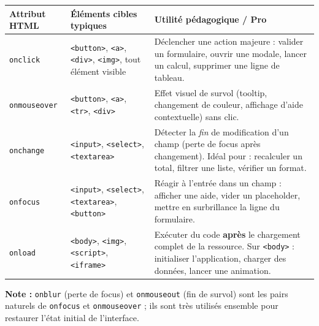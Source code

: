 \documentclass[11pt]{article}
\begin{document}
\begin{center}
\begin{tabularx}{\linewidth}{|l|X|X|}\hline
\rowcolor{popblueL}
\textbf{Attribut HTML} & \textbf{Éléments cibles typiques} & \textbf{Utilité pédagogique / Pro} \\\hline
\texttt{onclick} & \texttt{<button>}, \texttt{<a>}, \texttt{<div>}, \texttt{<img>}, tout élément visible & Déclencher une action majeure : valider un formulaire, ouvrir une modale, lancer un calcul, supprimer une ligne de tableau. \\\hline
\texttt{onmouseover} & \texttt{<button>}, \texttt{<a>}, \texttt{<tr>}, \texttt{<div>} & Effet visuel de survol (tooltip, changement de couleur, affichage d'aide contextuelle) sans clic. \\\hline
\texttt{onchange} & \texttt{<input>}, \texttt{<select>}, \texttt{<textarea>} & Détecter la \emph{fin} de modification d'un champ (perte de focus après changement). Idéal pour : recalculer un total, filtrer une liste, vérifier un format. \\\hline
\texttt{onfocus} & \texttt{<input>}, \texttt{<select>}, \texttt{<textarea>}, \texttt{<button>} & Réagir à l'entrée dans un champ : afficher une aide, vider un placeholder, mettre en surbrillance la ligne du formulaire. \\\hline
\texttt{onload} & \texttt{<body>}, \texttt{<img>}, \texttt{<script>}, \texttt{<iframe>} & Exécuter du code \textbf{après} le chargement complet de la ressource. Sur \texttt{<body>} : initialiser l'application, charger des données, lancer une animation. \\\hline
\end{tabularx}
\end{center}

\textbf{Note :} \texttt{onblur} (perte de focus) et \texttt{onmouseout} (fin de survol) sont les pairs naturels de \texttt{onfocus} et \texttt{onmouseover} ; ils sont très utilisés ensemble pour restaurer l'état initial de l'interface.
\end{document}
